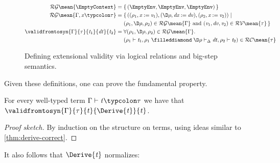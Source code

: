 \begin{figure}[h!]
\begin{align*}
                  \\
  \ensuremath{\mathcal{RG}\mean{\EmptyContext}} ={} & \{ \, \ensuremath{(\EmptyEnv,\EmptyEnv,\EmptyEnv)} \, \} \\
  \ensuremath{\mathcal{RG}\mean{\Gamma,\Varid{x}\typcolon\tau}} ={} &
                                  \{ \, \ensuremath{((\rho_{1},\Varid{x}\mathbin{:=}\Varid{v}_{1}),(\D\rho,\Varid{dx}\mathbin{:=}\Varid{dv}),(\rho_{2},\Varid{x}\mathbin{:=}\Varid{v}_{2}))\mid\\&(\rho_{1},\D\rho,\rho_{2})\in \mathcal{RG}\mean{\Gamma}\text{ and }(\Varid{v}_{1},\Varid{dv},\Varid{v}_{2})\in \mathcal{RV}\mean{\tau}} \, \} \\
  \ensuremath{\validfromtosyn{\Gamma}{\tau}{\Varid{t}_{1}}{\Varid{dt}}{\Varid{t}_{2}}} ={}&
                                      \ensuremath{\forall (\rho_{1},\D\rho,\rho_{2})\in \mathcal{RG}\mean{\Gamma}\hsforall \hsdot{\circ }{\mathpunct{.}}\\&(\rho_{1}\vdash\Varid{t}_{1},\rho_{1}\mathrel{\filleddiamond}\D\rho\vdash_{\Delta}\Varid{dt},\rho_{2}\vdash\Varid{t}_{2})\in \mathcal{RC}\mean{\tau}}
\end{align*}
\caption{Defining extensional validity via logical relations and big-step semantics.}
\label{fig:big-step-validity-ext-nosi}
\end{figure}

Given these definitions, one can prove the fundamental property.
\begin{theorem}
  \label{thm:fund-lemma-derive-correct-types-nosi}
  For every well-typed term \ensuremath{\Gamma\vdash\Varid{t}\typcolon\tau} we have that
  \ensuremath{\validfromtosyn{\Gamma}{\tau}{\Varid{t}}{\Derive{\Varid{t}}}{\Varid{t}}}.
\end{theorem}
\begin{proof}[Proof sketch]
  By induction on the structure on terms, using ideas similar to
  \cref{thm:derive-correct}.
\end{proof}

It also follows that \ensuremath{\Derive{\Varid{t}}} normalizes:

